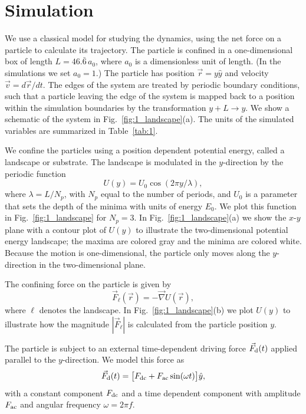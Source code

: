 \documentclass[preprint,showpacs,preprintnumbers,amsmath,amssymb,aps,prb]{revtex4-1}
\theoremstyle{remark}
\begin{document}
\section{Simulation}
\label{sec:MD}
We use a classical model for 
studying the dynamics, 
using the net force on a particle to calculate
its trajectory.
The particle is confined in a one-dimensional 
box of length $L=46.\bar{6}\,a_0$,
where $a_0$ is a dimensionless unit of length.
(In the simulations we set $a_0 = 1$.)
The particle 
has
position $\vec{r} = y \hat{y}$ 
and velocity $\vec{v} = d\vec{r}/dt$.
The edges of the system are treated by
periodic boundary conditions,
such that a particle leaving the edge of the system is mapped
back to a position within the simulation boundaries 
by the transformation $y+L \rightarrow y$. 
We show a schematic of the system in Fig.~\ref{fig:1_landscape}(a).
The units of the simulated variables are summarized in Table~\ref{tab:1}.

We confine the particles using a position dependent 
potential energy, called a landscape or substrate.
The landscape is modulated in the $y$-direction
by the periodic function 
 \begin{equation}
   U(y) = U_0 \cos{(2 \pi y / \lambda)},
     \label{eq:ysubstrate}
\end{equation}
where $\lambda=L/N_p$, with $N_p$ equal to the number of periods,
and $U_0$ is a parameter
 that sets the depth of the minima
 with  units of energy $E_0$. 
 We plot this function in 
 Fig.~\ref{fig:1_landscape}
 for $N_p = 3$.  In Fig.~\ref{fig:1_landscape}(a) we show 
 the $x$-$y$ plane with a contour plot of $U(y)$ 
 to illustrate
 the two-dimensional potential energy landscape;
 the maxima are colored gray and the minima are colored white.  
 Because the motion is one-dimensional, the particle only moves along the $y$-direction in the two-dimensional plane. %

The confining force on the particle 
is given by
 \begin{equation}
 \vec{F}_{\ell}(\vec{r}) = - \vec \nabla U(\vec{r}),
 \label{eq:dudr}
 \end{equation}
where $\ell$ denotes the landscape.
 In Fig.~\ref{fig:1_landscape}(b) we plot  
 $U(y)$ to illustrate how the magnitude
 $|\vec{F}_{\ell}|$ is calculated from the particle position $y$.
 
The particle is subject to an external time-dependent driving force
$\vec{F}_{\rm d}(t)$
applied parallel to the $y$-direction.
We model this force as
\begin{equation}
  \vec{F}_{\rm d}(t) = \big [F_{\rm dc} + F_{\rm ac} \sin(\omega t)\big] \hat{y},
    \label{eq:drive}
\end{equation}
with 
a constant component $F_{\rm dc}$
and a time dependent component with amplitude $F_{\rm ac}$
and angular frequency $\omega = 2 \pi f$.
\end{document}
